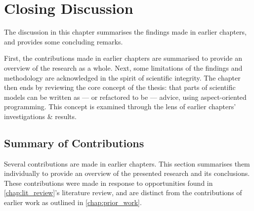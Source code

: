 \chapter{Closing Discussion}\label{chap:closing_discussion}

The discussion in this chapter summarises the findings made in earlier
chapters, and provides some concluding remarks.

First, the contributions made in earlier chapters are summarised to provide an
overview of the research as a whole. Next, some limitations of the findings and
methodology are acknowledged in the spirit of scientific integrity. The chapter
then ends by reviewing the core concept of the thesis: that parts of scientific
models can be written as --- or refactored to be --- advice, using
aspect-oriented programming. This concept is examined through the lens of
earlier chapters' investigations \& results.




\section{Summary of Contributions}
\label{conclusion:contributions}

Several contributions are made in earlier chapters. This section summarises them
individually to provide an overview of the presented research and its
conclusions. These contributions were made in response to opportunities found in
\cref{chap:lit_review}'s literature review, and are distinct from the
contributions of earlier work as outlined in \cref{chap:prior_work}.

